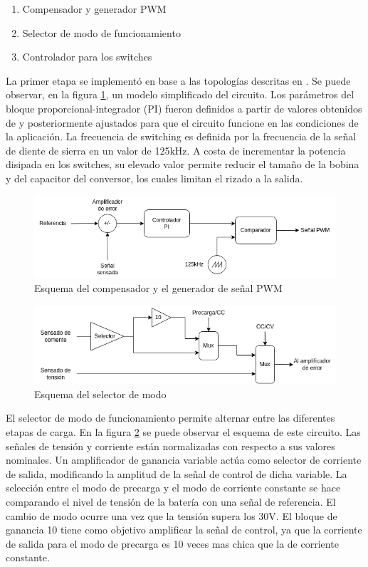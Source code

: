 \begin{enumerate}
    \item Compensador y generador PWM
    \item Selector de modo de funcionamiento
    \item Controlador para los switches
\end{enumerate}

La primer etapa se implementó en base a las topologías descritas en \cite{mohan}. Se puede observar,
en la figura \ref{fig:esquema_compensador}, un modelo simplificado del circuito.
Los parámetros del bloque proporcional-integrador (PI) fueron definidos a partir de valores obtenidos de \cite{mohan}
y posteriormente ajustados para que el circuito funcione en las condiciones de la aplicación.
La frecuencia de switching es definida por la frecuencia de la señal de diente de sierra en un valor de 125kHz. 
A costa de incrementar la potencia disipada en los switches,
su elevado valor permite reducir el tamaño de la bobina y del capacitor del conversor,
los cuales limitan el rizado a la salida. 

\begin{figure}
    \centering
    \includegraphics[width=\textwidth]{images/compensador.png}
    \caption{Esquema del compensador y el generador de señal PWM}
    \label{fig:esquema_compensador}
\end{figure}

\begin{figure}
    \centering
    \includegraphics[width=\textwidth]{images/selector.png}
    \caption{Esquema del selector de modo}
    \label{fig:esquema_selector}
\end{figure}

El selector de modo de funcionamiento permite alternar entre las diferentes etapas de carga.
En la figura \ref{fig:esquema_selector} se puede observar el esquema de este circuito.
Las señales de tensión y corriente están normalizadas con respecto a sus valores nominales.
Un amplificador de ganancia variable actúa como selector de corriente de salida,
modificando la amplitud de la señal de control de dicha variable.
La selección entre el modo de precarga y el modo de corriente constante se hace comparando el nivel de tensión de la batería
con una señal de referencia. El cambio de modo ocurre una vez que la tensión supera los 30V.
El bloque de ganancia 10 tiene como objetivo amplificar la señal de control, ya que la corriente de salida para el modo
de precarga es 10 veces mas chica que la de corriente constante.

